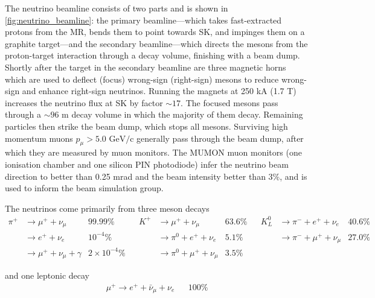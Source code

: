The neutrino beamline consists of two parts and is shown in \autoref{fig:neutrino_beamline}: the primary beamline---which takes fast-extracted protons from the MR, bends them to point towards SK, and impinges them on a graphite target---and the secondary beamline---which directs the mesons from the proton-target interaction through a decay volume, finishing with a beam dump. Shortly after the target in the secondary beamline are three magnetic horns\cite{t2k_horns} which are used to deflect (focus) wrong-sign (right-sign) mesons to reduce wrong-sign and enhance right-sign neutrinos. Running the magnets at 250 kA (1.7 T) increases the neutrino flux at SK by factor $\sim17$\cite{t2k_beam}. The focused mesons pass through a $\sim96$ m decay volume in which the majority of them decay. Remaining particles then strike the beam dump, which stops all mesons. Surviving high momentum muons $p_\mu > 5.0 \text{ GeV/c}$ generally pass through the beam dump, after which they are measured by muon monitors. The MUMON muon monitors (one ionisation chamber and one silicon PIN photodiode) infer the neutrino beam direction to better than 0.25 mrad and the beam intensity better than 3\%\cite{t2k_mumon,t2k_mumon2}, and is used to inform the beam simulation group.

The neutrinos come primarily from three meson decays
\begin{align*}
	\pi^+ & \rightarrow \mu^+ + \nu_\mu 		&  99.99\% 			& & K^+ & \rightarrow \mu^+ + \nu_\mu 			& 63.6\% & & K^0_L & \rightarrow \pi^- + e^+ + \nu_e 	  & 40.6\% \\
	      & \rightarrow e^+ + \nu_e 			&  10^{-4}\%		& &		& \rightarrow \pi^0 + e^+ + \nu_e 		& 5.1\%  & &	   & \rightarrow \pi^- + \mu^+ + \nu_\mu &  27.0\% \\
	      & \rightarrow \mu^+ + \nu_\mu + \gamma & 2\times 10^{-4}\%  & &		& \rightarrow \pi^0 + \mu^+ + \nu_\mu  	& 3.5\%  & &	   & & 		 &
\end{align*}

and one leptonic decay\cite{pdg_2017}
\begin{align*}
\mu^+ \rightarrow e^+ + \bar{\nu}_\mu + \nu_e & & 100\%
\end{align*}

